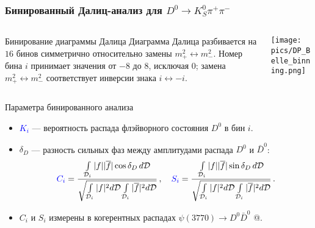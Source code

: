 \documentclass[10 pt,compress,mathserif]{beamer}
\newcommand{\dkspp}{\ensuremath{D^0\to K_S^0\pi^+\pi^-}\xspace}
\newcommand{\aad}{\ensuremath{|f|}\xspace}
\newcommand{\aadbar}{\ensuremath{|\overline{f}|}\xspace}
\begin{document}
\begin{frame}[containsverbatim]
 \frametitle{Бинированный Далиц-анализ для \dkspp}
 \begin{small}
 \begin{columns}
  \begin{column}{0.7\textwidth}
   \begin{block}{Бинирование диаграммы Далица}
  Диаграмма Далица разбивается на $16$ бинов симметрично относительно замены $m_+^2 \leftrightarrow m_-^2$. Номер бина $i$ принимает значения от $-8$ до $8$, исключая $0$; замена $m_+^2 \leftrightarrow m_-^2$ соответствует инверсии знака $i \leftrightarrow -i$.
 \end{block}
  \end{column}
  \begin{column}{0.3\textwidth}
   \texttt{[image: pics/DP\_Belle\_binning.png]}
  \end{column}
 \end{columns}

 \begin{block}{Параметра бинированного анализа}
 \begin{itemize}
  \item \textcolor{blue}{$K_i$} --- вероятность распада флэйворного состояния $D^0$ в бин $i$.
  \item $\delta_D$ --- разность сильных фаз между амплитудами распада $D^0$ и $\bar D^0$:
  \begin{equation*}
  \textcolor{blue}{C_i}=\frac{\int\limits_{\mathcal{D}_i}
            \aad\aadbar
            \cos\delta_D\,d\mathcal{D}
            }{\sqrt{
            \int\limits_{\mathcal{D}_i}\aad^2 d\mathcal{D}
            \int\limits_{\mathcal{D}_i}\aadbar^2 d\mathcal{D}
            }}\,, \quad
  \textcolor{blue}{S_i}=\frac{\int\limits_{\mathcal{D}_i}
            \aad\aadbar
            \sin\delta_D\,d\mathcal{D}
            }{\sqrt{
            \int\limits_{\mathcal{D}_i}\aad^2 d\mathcal{D}
            \int\limits_{\mathcal{D}_i}\aadbar^2 d\mathcal{D}
            }}\,.
  \label{cs}
  \end{equation*}
 \end{itemize}

 \end{block}

  \begin{itemize}
   \item $C_i$ и $S_i$ измерены в когерентных распадах $\psi(3770)\to D^0\bar D^0$ @.
  \end{itemize}
  \end{small}
\end{frame}
\end{document}

